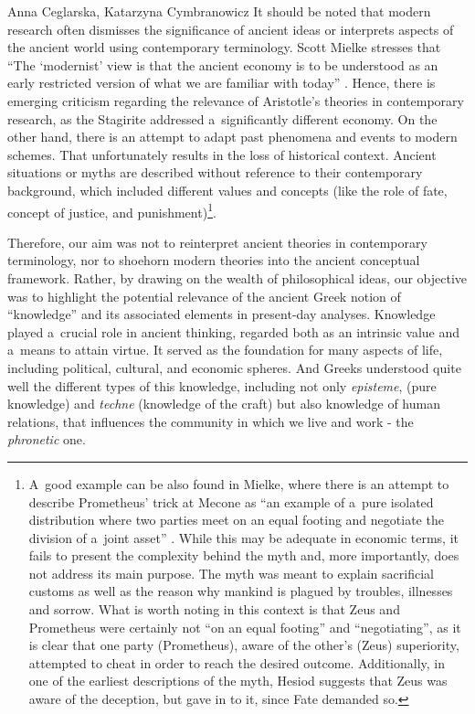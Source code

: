 \begin{artengenv2auth}{Anna Ceglarska, Katarzyna Cymbranowicz}
It should be noted that modern research often dismisses the significance of ancient ideas or interprets aspects of the ancient world using contemporary terminology. Scott Mielke stresses that ``The ‘modernist' view is that the ancient economy is to be understood as an early restricted version of what we are familiar with today'' 
\parencite[][p.2]{meikle_aristotles_1995}. %
 Hence, there is emerging criticism regarding the relevance of Aristotle's theories in contemporary research, as the Stagirite addressed a~significantly different economy. On the other hand, there is an attempt to adapt past phenomena and events to modern schemes. That unfortunately results in the loss of historical context. Ancient situations or myths are described without reference to their contemporary background, which included different values and concepts (like the role of fate, concept of justice, and punishment)\footnote{A~good example can be also found in Mielke, where there is an attempt to describe Prometheus' trick at Mecone as ``an example of a~pure isolated distribution where two parties meet on an equal footing and negotiate the division of a~joint asset'' 
\parencite[][p.178]{meikle_aristotles_1995}. %
 While this may be adequate in economic terms, it fails to present the complexity behind the myth and, more importantly, does not address its main purpose. The myth was meant to explain sacrificial customs as well as the reason why mankind is plagued by troubles, illnesses and sorrow. What is worth noting in this context is that Zeus and Prometheus were certainly not ``on an equal footing'' and ``negotiating'', as it is clear that one party (Prometheus), aware of the other's (Zeus) superiority, attempted to cheat in order to reach the desired outcome. Additionally, in one of the earliest descriptions of the myth, Hesiod suggests that Zeus was aware of the deception, but gave in to it, since Fate demanded so.}.



Therefore, our aim was not to reinterpret ancient theories in contemporary terminology, nor to shoehorn modern theories into the ancient conceptual framework. Rather, by drawing on the wealth of philosophical ideas, our objective was to highlight the potential relevance of the ancient Greek notion of ``knowledge'' and its associated elements in present-day analyses. Knowledge played a~crucial role in ancient thinking, regarded both as an intrinsic value and a~means to attain virtue. It served as the foundation for many aspects of life, including political, cultural, and economic spheres. And Greeks understood quite well the different types of this knowledge, including not only \textit{episteme}, (pure knowledge) and \textit{techne} (knowledge of the craft) but also knowledge of human relations, that influences the community in which we live and work - the \textit{phronetic} one.




\end{artengenv2auth}
